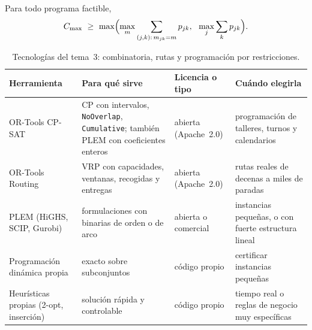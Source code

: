 \begin{proposicion}\label{prop:cota-ms}
Para todo programa factible,
\[
C_{\max}\ \ge\ \max\Bigl(\max_{m}\sum_{(j,k):\,m_{jk}=m}p_{jk},\ \ \max_j\sum_{k}p_{jk}\Bigr).
\]
\end{proposicion}

\addtocounter{definicion}{1}%

\begin{table}[h]
\centering\small
\caption{Tecnologías del tema~3: combinatoria, rutas y programación por restricciones.}\label{tab:tec3}
\begin{tabularx}{\textwidth}{@{}l>{\raggedright\arraybackslash}X>{\raggedright\arraybackslash}p{2.2cm}>{\raggedright\arraybackslash}X@{}}
\toprule
Herramienta & Para qué sirve & Licencia o tipo & Cuándo elegirla \\
\midrule
OR-Tools CP-SAT~\cite{ortools-cpsat} & CP con intervalos, \texttt{NoOverlap}, \texttt{Cumulative}; también PLEM con coeficientes enteros & abierta (Apache~2.0) & programación de talleres, turnos y calendarios \\
OR-Tools Routing~\cite{ortools-vrptw} & VRP con capacidades, ventanas, recogidas y entregas & abierta (Apache~2.0) & rutas reales de decenas a miles de paradas \\
PLEM (HiGHS, SCIP, Gurobi) & formulaciones con binarias de orden o de arco & abierta o comercial & instancias pequeñas, o con fuerte estructura lineal \\
Programación dinámica propia & exacto sobre subconjuntos & código propio & certificar instancias pequeñas \\
Heurísticas propias (2-opt, inserción) & solución rápida y controlable & código propio & tiempo real o reglas de negocio muy específicas \\
\bottomrule
\end{tabularx}
\end{table}

\addtocounter{definicion}{1}%

